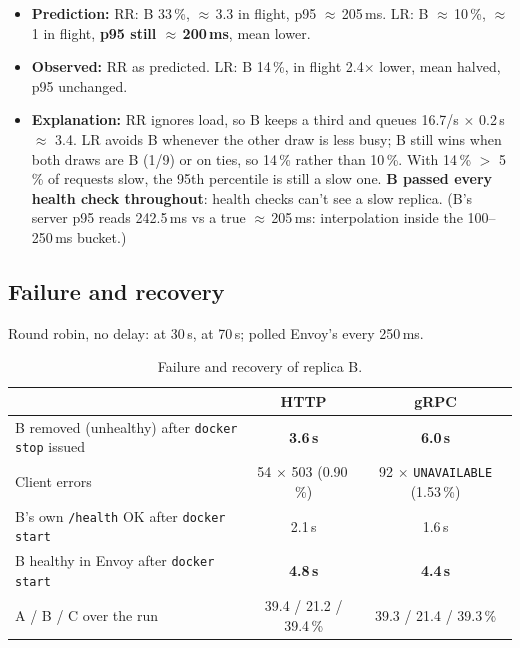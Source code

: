\documentclass[11pt,a4paper]{article}
\begin{document}
\begin{itemize}
  \item \textbf{Prediction:} RR: B 33\,\%, $\approx$\,3.3 in flight, p95 $\approx$\,205\,ms. LR: B $\approx$\,10\,\%, $\approx$\,1 in flight, \textbf{p95 still $\approx$\,200\,ms}, mean lower.
  \item \textbf{Observed:} RR as predicted. LR: B 14\,\%, in flight 2.4$\times$ lower, mean halved, p95 unchanged.
  \item \textbf{Explanation:} RR ignores load, so B keeps a third and queues 16.7/s $\times$ 0.2\,s $\approx$ 3.4. LR avoids B whenever the other draw is less busy; B still wins when both draws are B (1/9) or on ties, so 14\,\% rather than 10\,\%. With 14\,\% $>$ 5\,\% of requests slow, the 95th percentile is still a slow one. \textbf{B passed every health check throughout}: health checks can't see a slow replica. (B's server p95 reads 242.5\,ms vs a true $\approx$\,205\,ms: interpolation inside the 100--250\,ms bucket.)
\end{itemize}

\subsection{Failure and recovery}

Round robin, no delay:  at 30\,s,  at 70\,s;  polled Envoy's  every 250\,ms.

\begin{table}[htbp]
  \centering\small
  \caption{Failure and recovery of replica B.}
  \label{tab:failure}
  \begin{tabular}{@{}lcc@{}}
    \toprule
     & HTTP & gRPC \\
    \midrule
    B removed (unhealthy) after \texttt{docker stop} issued & \textbf{3.6\,s} & \textbf{6.0\,s} \\
    Client errors & 54 $\times$ 503 (0.90\,\%) & 92 $\times$ \texttt{UNAVAILABLE} (1.53\,\%) \\
    B's own \texttt{/health} OK after \texttt{docker start} & 2.1\,s & 1.6\,s \\
    B healthy in Envoy after \texttt{docker start} & \textbf{4.8\,s} & \textbf{4.4\,s} \\
    A / B / C over the run & 39.4 / 21.2 / 39.4\,\% & 39.3 / 21.4 / 39.3\,\% \\
    \bottomrule
  \end{tabular}
\end{table}
\end{document}
